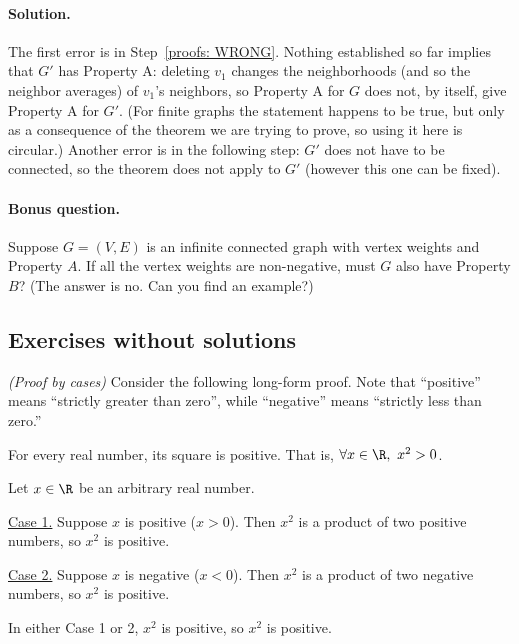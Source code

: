 \paragraph{Solution.}
The first error is in Step~\ref{proofs: WRONG}.
Nothing established so far implies that $G'$ has Property A:
deleting $v_1$ changes the neighborhoods (and so the neighbor averages) of $v_1$'s neighbors,
so Property A for $G$ does not, by itself, give Property A for $G'$.
(For finite graphs the statement happens to be true,
but only as a consequence of the theorem we are trying to prove,
so using it here is circular.)
Another error is in the following step:
$G'$ does not have to be connected, so the theorem does not apply to $G'$ (however this one can be fixed).

\vspace*{-1em}
\paragraph{Bonus question.}
Suppose $G=(V,E)$ is an infinite connected graph with vertex weights and Property $A$.
If all the vertex weights are non-negative, must $G$ also have Property $B$?  (The answer is no.  Can you find an example?)




\subsection{Exercises without solutions}\label{proofs: sec: exercises without solutions}

\exercise\emph{(Proof by cases)}\label{proofs: exercise: cases}
Consider the following long-form proof.
Note that
``positive'' means ``strictly greater than zero'', while
``negative'' means ``strictly less than zero.''  

\begin{theorem}[False!]
  For every real number, its square is positive. That is, $\forall x\in\R,~x^2 > 0$.
\end{theorem}
\begin{longFormProof}
  \step Let $x\in \R$ be an arbitrary real number.
  \begin{block}
    \step \underline{Case 1.} Suppose $x$ is positive ($x > 0$).
    \step Then $x^2$ is a product of two positive numbers, so $x^2$ is positive.
  \end{block}
  \begin{block}
    \step \underline{Case 2.} Suppose $x$ is negative ($x < 0$).
    \step Then $x^2$ is a product of two negative numbers, so $x^2$ is positive.
  \end{block}
  \step In either Case 1 or 2, $x^2$ is positive, so $x^2$ is positive.
\end{longFormProof}

